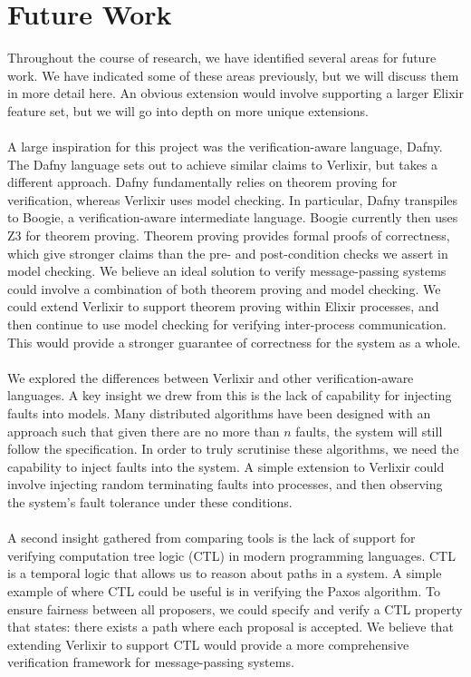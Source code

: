\section{Future Work}
Throughout the course of research, we have identified several areas for future work. We have indicated some of these areas previously, but we will discuss them in more detail here. An obvious extension would involve supporting a larger Elixir feature set, but we will go into depth on more unique extensions.
\\ \\
A large inspiration for this project was the verification-aware language, Dafny. The Dafny language sets out to achieve similar claims to Verlixir, but takes a different approach. Dafny fundamentally relies on theorem proving for verification, whereas Verlixir uses model checking. In particular, Dafny transpiles to Boogie, a verification-aware intermediate language. Boogie currently then uses Z3 for theorem proving. Theorem proving provides formal proofs of correctness, which give stronger claims than the pre- and post-condition checks we assert in model checking. We believe an ideal solution to verify message-passing systems could involve a combination of both theorem proving and model checking. We could extend Verlixir to support theorem proving within Elixir processes, and then continue to use model checking for verifying inter-process communication. This would provide a stronger guarantee of correctness for the system as a whole.
\\ \\
We explored the differences between Verlixir and other verification-aware languages. A key insight we drew from this is the lack of capability for injecting faults into models. Many distributed algorithms have been designed with an approach such that given there are no more than $n$ faults, the system will still follow the specification. In order to truly scrutinise these algorithms, we need the capability to inject faults into the system. A simple extension to Verlixir could involve injecting random terminating faults into processes, and then observing the system's fault tolerance under these conditions.
\\ \\
A second insight gathered from comparing tools is the lack of support for verifying computation tree logic (CTL) in modern programming languages. CTL is a temporal logic that allows us to reason about paths in a system. A simple example of where CTL could be useful is in verifying the Paxos algorithm. To ensure fairness between all proposers, we could specify and verify a CTL property that states: there exists a path where each proposal is accepted. We believe that extending Verlixir to support CTL would provide a more comprehensive verification framework for message-passing systems.
